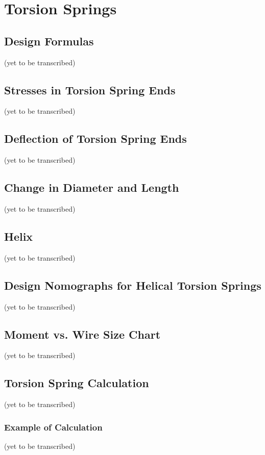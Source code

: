 \documentclass[10pt]{article}
\begin{document}
\clearpage
\section{Torsion Springs} %
\subsection{Design Formulas} %
(yet to be transcribed)

\subsection{Stresses in Torsion Spring Ends} %
(yet to be transcribed)

\subsection{Deflection of Torsion Spring Ends} %
(yet to be transcribed)

\subsection{Change in Diameter and Length} %
(yet to be transcribed)

\subsection{Helix} %
(yet to be transcribed)

\subsection{Design Nomographs for Helical Torsion Springs} %
(yet to be transcribed)

\subsection{Moment vs. Wire Size Chart} %
(yet to be transcribed)

\subsection{Torsion Spring Calculation} %
(yet to be transcribed)

\subsubsection{Example of Calculation} %
(yet to be transcribed)
\end{document}
